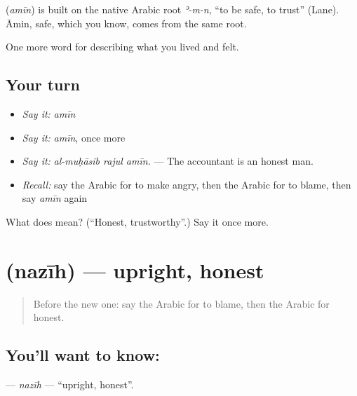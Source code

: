 \begin{cousinweb}
\textbf{} (\emph{amīn}) is built on the native Arabic root \emph{ʾ-m-n}, \textquotedblleft{}to be safe, to trust\textquotedblright{} (Lane). Āmin, safe, which you know, comes from the same root.
\end{cousinweb}

\begin{grammarlens}[title={What you've built}]
One more word for describing what you lived and felt.
\end{grammarlens}

\subsection*{Your turn}
\begin{itemize}
\raggedright
  \item \emph{Say it:} \emph{amīn}
  \item \emph{Say it:} \emph{amīn}, once more
  \item \emph{Say it:} \emph{al-muḥāsib rajul amīn.} — The accountant is an honest man.
  \item \emph{Recall:} say the Arabic for to make angry, then the Arabic for to blame, then say \emph{amīn} again
\end{itemize}

\begin{tcolorbox}[breakable,colback=teal!4,colframe=teal!35!black,title={Before you move on}]
What does  mean? (\textquotedblleft{}Honest, trustworthy\textquotedblright{}.) Say it once more.
\end{tcolorbox}
\section[\texorpdfstring{\ar{نزيه} (nazīh)}{نزيه (nazīh)}]{ (nazīh) — upright, honest}

\label{lesson:AR-C499-nazih}



\begin{quote}
Before the new one: say the Arabic for to blame, then the Arabic for honest.
\end{quote}

\subsection*{You'll want to know: }
\textbf{} — \emph{nazīh} — \textquotedblleft{}upright, honest\textquotedblright{}.

